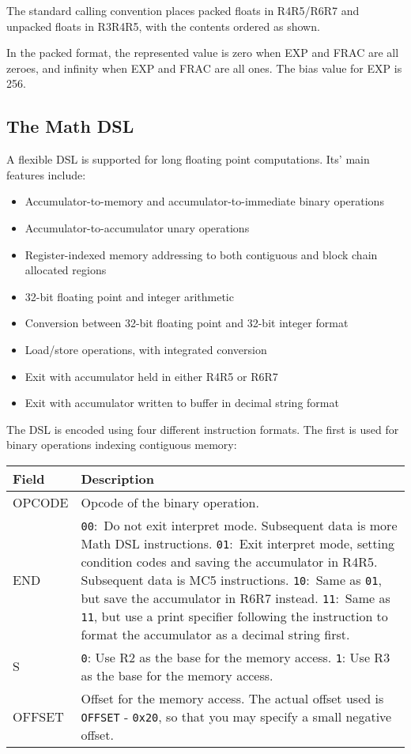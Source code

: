 \documentclass[hidelinks,11pt]{article}
\newcommand{\tn}[1]{\textnormal{#1}}
\newcommand{\gap}{\bigskip\noindent}
\newlength{\bit}
\newcommand{\insntbl}[1]{\luadirect{insntbl([[#1]])}}
\begin{document}
\gap
The standard calling convention places packed floats in R4R5/R6R7 and unpacked floats in R3R4R5, with the contents ordered as shown.

\gap
In the packed format, the represented value is zero when EXP and FRAC are all zeroes, and infinity when EXP and FRAC are all ones. The bias value for EXP is 256.

\subsection{The Math DSL}
A flexible DSL is supported for long floating point computations. Its' main features include:
\begin{itemize}
\item Accumulator-to-memory and accumulator-to-immediate binary operations
\item Accumulator-to-accumulator unary operations
\item Register-indexed memory addressing to both contiguous and block chain allocated regions
\item 32-bit floating point and integer arithmetic
\item Conversion between 32-bit floating point and 32-bit integer format
\item Load/store operations, with integrated conversion
\item Exit with accumulator held in either R4R5 or R6R7
\item Exit with accumulator written to buffer in decimal string format
\end{itemize}

\noindent
The DSL is encoded using four different instruction formats. The first is used for binary operations indexing contiguous memory:

\insntbl
{
  OPCODE, 4,
  END, 2,
  S, 1,
  OFFSET, 9,
}

\gap
\begin{tabular}{|L|p{8cm}|}
  \hline
  \tn{Field} & Description \\
  \hline
  OPCODE & Opcode of the binary operation. \\
  \hline
  END & \texttt{00}:\ Do not exit interpret mode. Subsequent data is more Math DSL instructions. \newline
        \texttt{01}:\ Exit interpret mode, setting condition codes and saving the accumulator in R4R5. Subsequent data is MC5 instructions. \newline
        \texttt{10}:\ Same as \texttt{01}, but save the accumulator in R6R7 instead. \newline
        \texttt{11}:\ Same as \texttt{11}, but use a print specifier following the instruction to format the accumulator as a decimal string first. \\
  \hline
  S & \texttt{0}: Use R2 as the base for the memory access. \newline
      \texttt{1}: Use R3 as the base for the memory access. \\
  \hline
  OFFSET & Offset for the memory access. The actual offset used is \texttt{OFFSET} - \texttt{0x20}, so that you may specify a small negative offset. \\
  \hline
\end{tabular}
\end{document}
